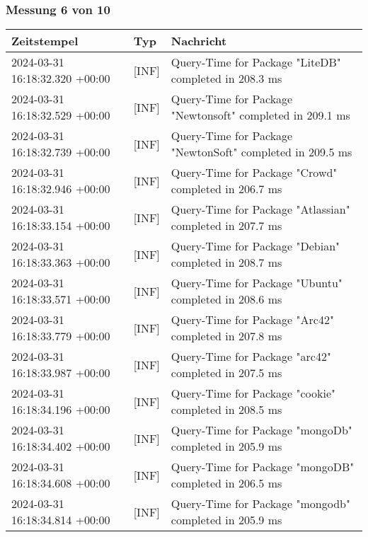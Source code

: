    \subsubsection*{Messung 6 von 10} \label{subsubsec:MySQLOhneIndex6von10}
        {
            {\small
                \begin{tabularx}{\textwidth}{|l|l|X|}
                    \hline
                    \textbf{Zeitstempel} & \textbf{Typ} & \textbf{Nachricht} \\
                    \hline
                    \endhead
                    2024-03-31 16:18:32.320 +00:00 & [INF] & Query-Time for Package "LiteDB" completed in 208.3 ms \\
                    2024-03-31 16:18:32.529 +00:00 & [INF] & Query-Time for Package "Newtonsoft" completed in 209.1 ms \\
                    2024-03-31 16:18:32.739 +00:00 & [INF] & Query-Time for Package "NewtonSoft" completed in 209.5 ms \\
                    2024-03-31 16:18:32.946 +00:00 & [INF] & Query-Time for Package "Crowd" completed in 206.7 ms \\
                    2024-03-31 16:18:33.154 +00:00 & [INF] & Query-Time for Package "Atlassian" completed in 207.7 ms \\
                    2024-03-31 16:18:33.363 +00:00 & [INF] & Query-Time for Package "Debian" completed in 208.7 ms \\
                    2024-03-31 16:18:33.571 +00:00 & [INF] & Query-Time for Package "Ubuntu" completed in 208.6 ms \\
                    2024-03-31 16:18:33.779 +00:00 & [INF] & Query-Time for Package "Arc42" completed in 207.8 ms \\
                    2024-03-31 16:18:33.987 +00:00 & [INF] & Query-Time for Package "arc42" completed in 207.5 ms \\
                    2024-03-31 16:18:34.196 +00:00 & [INF] & Query-Time for Package "cookie" completed in 208.5 ms \\
                    2024-03-31 16:18:34.402 +00:00 & [INF] & Query-Time for Package "mongoDb" completed in 205.9 ms \\
                    2024-03-31 16:18:34.608 +00:00 & [INF] & Query-Time for Package "mongoDB" completed in 206.5 ms \\
                    2024-03-31 16:18:34.814 +00:00 & [INF] & Query-Time for Package "mongodb" completed in 205.9 ms \\

\end{tabularx}}}
